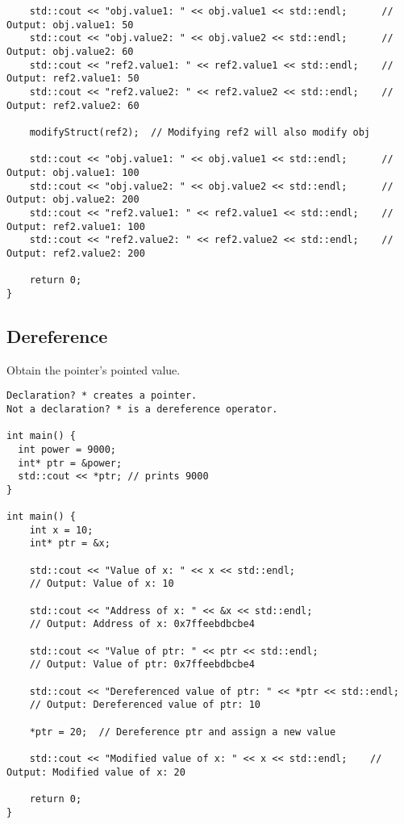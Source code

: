 \begin{verbatim}
    std::cout << "obj.value1: " << obj.value1 << std::endl;      // Output: obj.value1: 50
    std::cout << "obj.value2: " << obj.value2 << std::endl;      // Output: obj.value2: 60
    std::cout << "ref2.value1: " << ref2.value1 << std::endl;    // Output: ref2.value1: 50
    std::cout << "ref2.value2: " << ref2.value2 << std::endl;    // Output: ref2.value2: 60

    modifyStruct(ref2);  // Modifying ref2 will also modify obj

    std::cout << "obj.value1: " << obj.value1 << std::endl;      // Output: obj.value1: 100
    std::cout << "obj.value2: " << obj.value2 << std::endl;      // Output: obj.value2: 200
    std::cout << "ref2.value1: " << ref2.value1 << std::endl;    // Output: ref2.value1: 100
    std::cout << "ref2.value2: " << ref2.value2 << std::endl;    // Output: ref2.value2: 200

    return 0;
}

\end{verbatim}
\subsection{Dereference}

Obtain the pointer's pointed value. 

\begin{verbatim}
Declaration? * creates a pointer.
Not a declaration? * is a dereference operator.

int main() {
  int power = 9000;
  int* ptr = &power;
  std::cout << *ptr; // prints 9000
}

int main() {
    int x = 10;
    int* ptr = &x;

    std::cout << "Value of x: " << x << std::endl;            
    // Output: Value of x: 10

    std::cout << "Address of x: " << &x << std::endl;         
    // Output: Address of x: 0x7ffeebdbcbe4

    std::cout << "Value of ptr: " << ptr << std::endl;        
    // Output: Value of ptr: 0x7ffeebdbcbe4

    std::cout << "Dereferenced value of ptr: " << *ptr << std::endl;  
    // Output: Dereferenced value of ptr: 10

    *ptr = 20;  // Dereference ptr and assign a new value

    std::cout << "Modified value of x: " << x << std::endl;    // Output: Modified value of x: 20

    return 0;
}
\end{verbatim}

